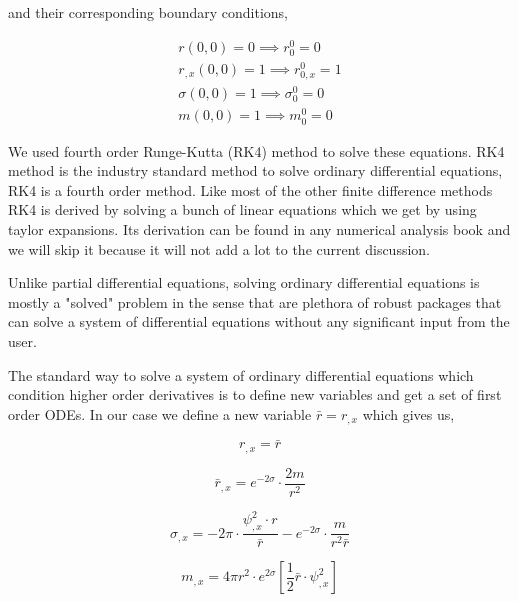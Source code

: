 and their corresponding boundary conditions,

\begin{eqnarray}
    r(0 ,0) = 0 \implies r^0_0 = 0 \\
    r_{,x}(0 ,0) = 1 \implies r^0_{0,x} = 1 \\
    \sigma(0 ,0) = 1 \implies \sigma^0_0 = 0 \\
    m(0 ,0) = 1 \implies m^0_0 = 0
\end{eqnarray}

We used fourth order Runge-Kutta (RK4) method to solve these equations. RK4 method is the industry standard method to solve ordinary differential equations, RK4 is a fourth order method. Like most of the other finite difference methods RK4 is derived by solving a bunch of linear equations which we get by using taylor expansions. Its derivation can be found in any numerical analysis book and we will skip it because it will not add a lot to the current discussion.

Unlike partial differential equations, solving ordinary differential equations is mostly a "solved" problem in the sense that are plethora of robust packages that can solve a system of differential equations without any significant input from the user.

The standard way to solve a system of ordinary differential equations which condition higher order derivatives is to define new variables and get a set of first order ODEs. In our case we define a new variable $\bar r = r_{,x}$ which gives us,


\begin{equation}
    r_{,x} = \bar r
    \label{eqn:r2_ic}
\end{equation}

\begin{equation}
    \bar r_{,x}=e^{-2 \sigma} \cdot \frac{2 m}{r^{2}}
    \label{eqn:br2_ic}
\end{equation}


\begin{equation}
    \sigma_{, x}= -2 \pi \cdot  \frac{\psi_{, x}^{2} \cdot r}{\bar r}- e^{-2 \sigma} \cdot \frac{ m}{r^{2}\bar r}
    \label{eqn:sigma2_ic}
\end{equation}

\begin{equation}
    m_{, x}=4 \pi r^{2} \cdot e^{2 \sigma}\left[\frac{1}{2} \bar r \cdot \psi_{, x}^{2} \right]
    \label{eqn:m2_ic}
\end{equation}

